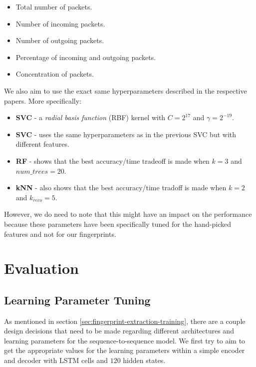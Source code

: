 \begin{itemize}
  \item Total number of packets.
  \item Number of incoming packets.
  \item Number of outgoing packets.
  \item Percentage of incoming and outgoing packets.
  \item Concentration of packets.
\end{itemize}

We also aim to use the exact same hyperparameters described in the respective papers. More specifically:
\begin{itemize}
  \item \textbf{SVC} \cite{panchenko1} - a \textit{radial basis function} (RBF) kernel with $C = 2^{17}$ and $\gamma = 2^{-19}$.
  \item \textbf{SVC} \cite{panchenko2} - uses the same hyperparameters as in the previous SVC but with different features.
  \item \textbf{RF} \cite{kfingerprinting} - shows that the best accuracy/time tradeoff is made when $k = 3$ and $\textit{num\_trees} = 20$.
  \item \textbf{kNN} \cite{wang_cai_johnson_nithyanand_goldberg_2014} - also shows that the best accuracy/time tradoff is made when $k = 2$ and $k_{\textit{reco}} = 5$.
\end{itemize}

However, we do need to note that this might have an impact on the performance because these parameters have been specifically tuned for the hand-picked features and not for our fingerprints.

\section{Evaluation}

\subsection{Learning Parameter Tuning}

As mentioned in section \ref{sec:fingerprint-extraction-training}, there are a couple design decisions that need to be made regarding different architectures and learning parameters for the sequence-to-sequence model.
We first try to aim to get the appropriate values for the learning parameters within a simple encoder and decoder with LSTM cells and $120$ hidden states.

